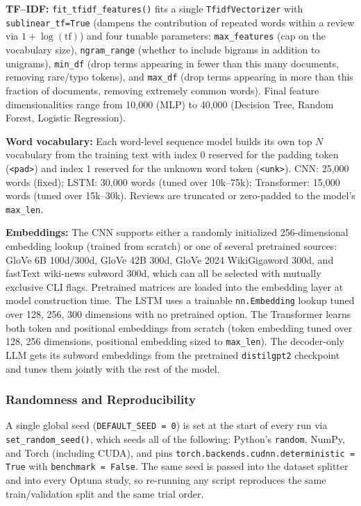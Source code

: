 \documentclass[12pt]{article}
\begin{document}
\textbf{TF--IDF:} \texttt{fit\_tfidf\_features()} fits a single \texttt{TfidfVectorizer} with \texttt{sublinear\_tf=True} (dampens the contribution of repeated words within a review via $1 + \log(\text{tf})$) and four tunable parameters: \texttt{max\_features} (cap on the vocabulary size), \texttt{ngram\_range} (whether to include bigrams in addition to unigrams), \texttt{min\_df} (drop terms appearing in fewer than this many documents, removing rare/typo tokens), and \texttt{max\_df} (drop terms appearing in more than this fraction of documents, removing extremely common words). Final feature dimensionalities range from 10,000 (MLP) to 40,000 (Decision Tree, Random Forest, Logistic Regression).

\textbf{Word vocabulary:} Each word-level sequence model builds its own top $N$ vocabulary from the training text with index 0 reserved for the padding token (\texttt{<pad>}) and index 1 reserved for the unknown word token (\texttt{<unk>}). CNN: 25,000 words (fixed); LSTM: 30,000 words (tuned over 10k--75k); Transformer: 15,000 words (tuned over 15k--30k). Reviews are truncated or zero-padded to the model's \texttt{max\_len}.

\textbf{Embeddings:} The CNN supports either a randomly initialized 256-dimensional embedding lookup (trained from scratch) or one of several pretrained sources: GloVe 6B 100d/300d, GloVe 42B 300d, GloVe 2024 WikiGigaword 300d, and fastText wiki-news subword 300d, which can all be selected with mutually exclusive CLI flags. Pretrained matrices are loaded into the embedding layer at model construction time. The LSTM uses a trainable \texttt{nn.Embedding} lookup tuned over {128, 256, 300} dimensions with no pretrained option. The Transformer learns both token and positional embeddings from scratch (token embedding tuned over {128, 256} dimensions, positional embedding sized to \texttt{max\_len}). The decoder-only LLM gets its subword embeddings from the pretrained \texttt{distilgpt2} checkpoint and tunes them jointly with the rest of the model.

\subsubsection{Randomness and Reproducibility}

A single global seed (\texttt{DEFAULT\_SEED = 0}) is set at the start of every run via \texttt{set\_random\_seed()}, which seeds all of the following: Python's \texttt{random}, NumPy, and Torch (including CUDA), and pins \texttt{torch.backends.cudnn.deterministic = True} with \texttt{benchmark = False}. The same seed is passed into the dataset splitter and into every Optuna study, so re-running any script reproduces the same train/validation split and the same trial order.
\end{document}
